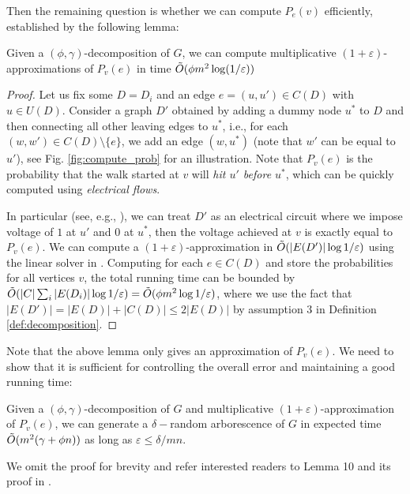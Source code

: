 Then the remaining question is whether we can compute $P_e(v)$ efficiently, established by the following lemma:
\begin{lemma}[Computing $P_v(e)$]
    \label{lem:compute_prob}
    Given a $(\phi, \gamma)$-decomposition of $G$, we can compute multiplicative $(1+\varepsilon)$-approximations of $P_v(e)$ in time $\tilde{O}(\phi m^2 \log(1/\varepsilon))$
\end{lemma}
\begin{proof}
    Let us fix some $D=D_i$ and an edge $e=(u, u') \in C(D)$ with $u \in U(D)$. Consider a graph $D'$ obtained by adding a dummy node $u^*$ to $D$ and then connecting all other leaving edges to $u^*$, i.e., for each $(w, w') \in C(D) \setminus \{e\}$, we add an edge $(w, u^*)$ (note that $w'$ can be equal to $u'$), see Fig. \ref{fig:compute_prob} for an illustration. Note that $P_v(e)$ is the probability that the walk started at $v$ will \emph{hit $u'$ before $u^*$}, which can be quickly computed using \emph{electrical flows}.

    In particular (see, e.g., \cite{lovasz1993random}), we can treat $D'$ as an electrical circuit where we impose voltage of $1$ at $u'$ and $0$ at $u^*$, then the voltage achieved at $v$ is exactly equal to $P_v(e)$. We can compute a $(1+\varepsilon)$-approximation in $\tilde{O}(|E(D')|\log1/\varepsilon)$ using the linear solver in \cite{spielman2014nearly}. Computing for each $e \in C(D)$ and store the probabilities for all vertices $v$, the total running time can be bounded by $\tilde{O}(|C|\sum_i |E(D_i)| \log 1/\varepsilon)=\tilde{O}(\phi m^2 \log 1/\varepsilon)$, where we use the fact that $|E(D')| = |E(D)| + |C(D)| \leq 2 |E(D)|$ by assumption 3 in Definition \ref{def:decomposition}.
\end{proof}

Note that the above lemma only gives an approximation of $P_v(e)$. We need to show that it is sufficient for controlling the overall error and maintaining a good running time:
\begin{lemma}
    \label{lem:sufficiency}
    Given a $(\phi, \gamma)$-decomposition of $G$ and multiplicative $(1+\varepsilon)$-approximation of $P_v(e)$, we can generate a $\delta-$random arborescence of $G$ in expected time $\tilde{O}(m^2(\gamma+\phi n))$ as long as $\varepsilon \leq \delta / mn$.
\end{lemma}
We omit the proof for brevity and refer interested readers to Lemma 10 and its proof in \cite{kelner2009faster}.%


